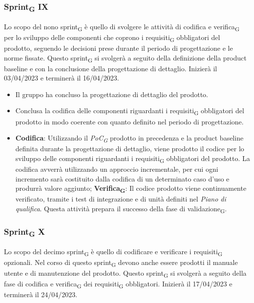 \subsubsection{Sprint\textsubscript{G} IX}
Lo scopo del nono sprint\textsubscript{G} è quello di svolgere le attività di codifica e verifica\textsubscript{G} per lo sviluppo delle componenti che coprono i requisiti\textsubscript{G} obbligatori 
del prodotto, seguendo le decisioni prese durante il periodo di progettazione e le norme fissate.
Questo sprint\textsubscript{G} si svolgerà a seguito della definizione della product baseline e con la conclusione della progettazione di dettaglio. Inizierà il 03/04/2023 e terminerà il 16/04/2023.

\:
\begin{itemize}
	\item Il gruppo ha concluso la progettazione di dettaglio del prodotto.
\end{itemize}

\:
\begin{itemize}
	\item Conclusa la codifica delle componenti riguardanti i requisiti\textsubscript{G} obbligatori del prodotto in modo coerente con quanto definito nel periodo di progettazione.
\end{itemize}

\:
\begin{itemize}
	\item \textbf{Codifica}: Utilizzando il \textit{PoC\textsubscript{G}} prodotto in precedenza e la product baseline definita durante la progettazione di dettaglio, viene prodotto il codice per lo sviluppo delle componenti riguardanti i requisiti\textsubscript{G} obbligatori del prodotto. La codifica avverrà utilizzando un approccio incrementale, per cui ogni incremento sarà costituito dalla codifica di un determinato caso d’uso e produrrà valore aggiunto;
	\subitem \textbf{Verifica\textsubscript{G}}: Il codice prodotto viene continuamente verificato, tramite i test di integrazione e di unità definiti nel \textit{Piano di qualifica}. Questa attività prepara il successo della fase di validazione\textsubscript{G}.
\end{itemize}

\subsubsection{Sprint\textsubscript{G} X}
Lo scopo del decimo sprint\textsubscript{G} è quello di codificare e verificare i requisiti\textsubscript{G} opzionali. Nel corso di questo sprint\textsubscript{G} devono anche essere prodotti il manuale utente e di manutenzione del prodotto.
Questo sprint\textsubscript{G} si svolgerà a seguito della fase di codifica e verifica\textsubscript{G} dei requisiti\textsubscript{G} obbligatori. Inizierà il 17/04/2023 e terminerà il 24/04/2023.

